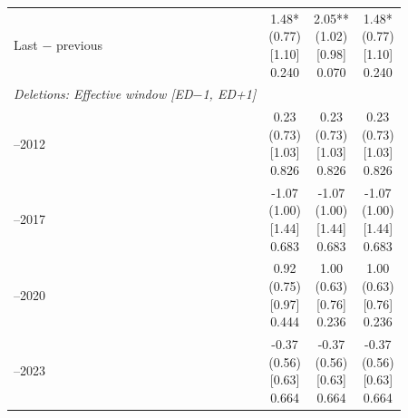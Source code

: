 \begin{threeparttable}
\begin{tabular}{@{}lccc}
\addlinespace[0.25ex]
\addlinespace[0.25ex]
Last $-$ previous & \makecell{1.48*\\(0.77)\\{}[1.10]\\{0.240}} & \makecell{2.05**\\(1.02)\\{}[0.98]\\{0.070}} & \makecell{1.48*\\(0.77)\\{}[1.10]\\{0.240}} \\
\addlinespace[0.25ex]
\midrule
\emph{Deletions: Effective window [ED$-$1, ED+1]} \\
\addlinespace[0.25ex]
\addlinespace[1ex]
2007–2012 & \makecell{0.23\\(0.73)\\{}[1.03]\\{0.826}} & \makecell{0.23\\(0.73)\\{}[1.03]\\{0.826}} & \makecell{0.23\\(0.73)\\{}[1.03]\\{0.826}} \\
\addlinespace[0.25ex]
\addlinespace[0.25ex]
2013–2017 & \makecell{-1.07\\(1.00)\\{}[1.44]\\{0.683}} & \makecell{-1.07\\(1.00)\\{}[1.44]\\{0.683}} & \makecell{-1.07\\(1.00)\\{}[1.44]\\{0.683}} \\
\addlinespace[0.25ex]
\addlinespace[0.25ex]
2018–2020 & \makecell{0.92\\(0.75)\\{}[0.97]\\{0.444}} & \makecell{1.00\\(0.63)\\{}[0.76]\\{0.236}} & \makecell{1.00\\(0.63)\\{}[0.76]\\{0.236}} \\
\addlinespace[0.25ex]
\addlinespace[0.25ex]
2021–2023 & \makecell{-0.37\\(0.56)\\{}[0.63]\\{0.664}} & \makecell{-0.37\\(0.56)\\{}[0.63]\\{0.664}} & \makecell{-0.37\\(0.56)\\{}[0.63]\\{0.664}} \\

\end{tabular}
\end{threeparttable}
